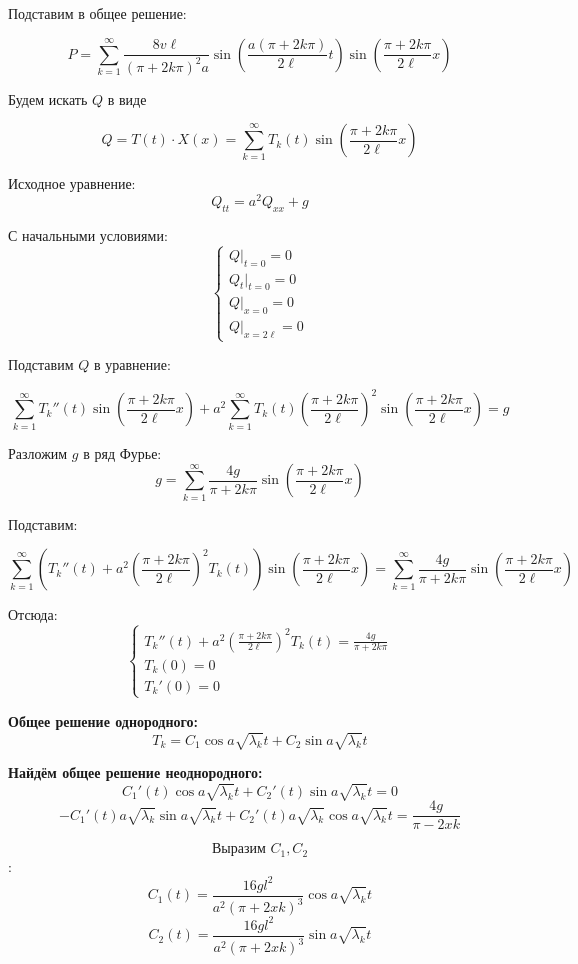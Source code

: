 \documentclass[a4paper,12pt]{article}
\begin{document}
Подставим в общее решение:

\[
P = \sum_{k=1}^{\infty} \frac{8 v \ell}{(\pi + 2k\pi)^2 a} \sin\left( \frac{a (\pi + 2k\pi)}{2\ell} t \right) \sin\left( \frac{\pi + 2k\pi}{2\ell} x \right)
\]

Будем искать $Q$ в виде

\[
Q = T(t) \cdot X(x) = \sum_{k=1}^{\infty} T_k(t) \sin\left( \frac{\pi + 2k\pi}{2\ell} x \right)
\]

Исходное уравнение:
\[
Q_{tt} = a^2 Q_{xx} + g
\]

С начальными условиями:
\[
\begin{cases}
Q|_{t=0} = 0 \\
Q_t|_{t=0} = 0 \\
Q|_{x=0} = 0 \\
Q|_{x=2\ell} = 0
\end{cases}
\]

Подставим $Q$ в уравнение:

\[
\sum_{k=1}^{\infty} T_k''(t) \sin\left( \frac{\pi + 2k\pi}{2\ell} x \right) + a^2 \sum_{k=1}^{\infty} T_k(t) \left( \frac{\pi + 2k\pi}{2\ell} \right)^2 \sin\left( \frac{\pi + 2k\pi}{2\ell} x \right) = g
\]

Разложим $g$ в ряд Фурье:
\[
g = \sum_{k=1}^{\infty} \frac{4g}{\pi + 2k\pi} \sin\left( \frac{\pi + 2k\pi}{2\ell} x \right)
\]

Подставим:

\[
\sum_{k=1}^{\infty} \left( T_k''(t) + a^2 \left( \frac{\pi + 2k\pi}{2\ell} \right)^2 T_k(t) \right) \sin\left( \frac{\pi + 2k\pi}{2\ell} x \right)
= \sum_{k=1}^{\infty} \frac{4g}{\pi + 2k\pi} \sin\left( \frac{\pi + 2k\pi}{2\ell} x \right)
\]

Отсюда:
\[
\begin{cases}
T_k''(t) + a^2 \left( \frac{\pi + 2k\pi}{2\ell} \right)^2 T_k(t) = \frac{4g}{\pi + 2k\pi} \\
T_k(0) = 0 \\
T_k'(0) = 0
\end{cases}
\]

\textbf{Общее решение однородного:}
$$T_k = C_1 \cos a \sqrt{\lambda_k} t + C_2 \sin a \sqrt{\lambda_k} t$$

\textbf{Найдём общее решение неоднородного:}
$$C_1'(t) \cos a \sqrt{\lambda_k} t + C_2'(t) \sin a \sqrt{\lambda_k} t = 0$$
$$- C_1'(t) a \sqrt{\lambda_k} \sin a \sqrt{\lambda_k} t + C_2'(t) a \sqrt{\lambda_k} \cos a \sqrt{\lambda_k} t = \frac{4g}{\pi - 2xk}$$

$$\textbf{Выразим } C_1, C_2$$:
$$C_1(t) = \frac{16 g l^2}{a^2 (\pi + 2 x k)^3} \cos a \sqrt{\lambda_k} t$$
$$C_2(t) = \frac{16 g l^2}{a^2 (\pi + 2 x k)^3} \sin a \sqrt{\lambda_k} t$$
\end{document}
